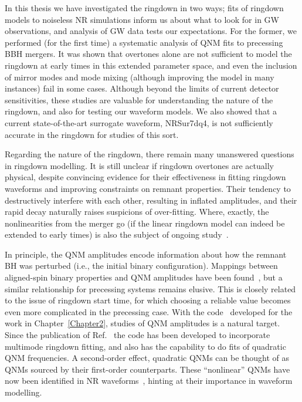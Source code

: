 \documentclass[
12pt, %
english, %
doublespacing, %
headsepline, %
]{MastersDoctoralThesis} %
\begin{document}
In this thesis we have investigated the ringdown in two ways; fits of ringdown models to noiseless NR simulations inform us about what to look for in GW observations, and analysis of GW data tests our expectations.
For the former, we performed (for the first time) a systematic analysis of QNM fits to precessing BBH mergers.
It was shown that overtones alone are not sufficient to model the ringdown at early times in this extended parameter space, and even the inclusion of mirror modes and mode mixing (although improving the model in many instances) fail in some cases.
Although beyond the limits of current detector sensitivities, these studies are valuable for understanding the nature of the ringdown, and also for testing our waveform models.
We also showed that a current state-of-the-art surrogate waveform, NRSur7dq4, is not sufficiently accurate in the ringdown for studies of this sort.

Regarding the nature of the ringdown, there remain many unanswered questions in ringdown modelling. 
It is still unclear if ringdown overtones are actually physical, despite convincing evidence for their effectiveness in fitting ringdown waveforms and improving constraints on remnant properties.
Their tendency to destructively interfere with each other, resulting in inflated amplitudes, and their rapid decay naturally raises suspicions of over-fitting.
Where, exactly, the nonlinearities from the merger go (if the linear ringdown model can indeed be extended to early times) is also the subject of ongoing study~\cite{Okounkova:2020vwu}.

In principle, the QNM amplitudes encode information about how the remnant BH was perturbed (i.e., the initial binary configuration).
Mappings between aligned-spin binary properties and QNM amplitudes have been found~\cite{London:2014cma}, but a similar relationship for precessing systems remains elusive.
This is closely related to the issue of ringdown start time, for which choosing a reliable value becomes even more complicated in the precessing case.
With the code~\cite{qnmfits} developed for the work in Chapter~\ref{Chapter2}, studies of QNM amplitudes is a natural target.
Since the publication of Ref.~\cite{Finch:2021iip} the code has been developed to incorporate multimode ringdown fitting, and also has the capability to do fits of quadratic QNM frequencies.
A second-order effect, quadratic QNMs can be thought of as QNMs sourced by their first-order counterparts.
These ``nonlinear'' QNMs have now been identified in NR waveforms~\cite{Cheung:2022rbm, Mitman:2022qdl}, hinting at their importance in waveform modelling.
\end{document}
